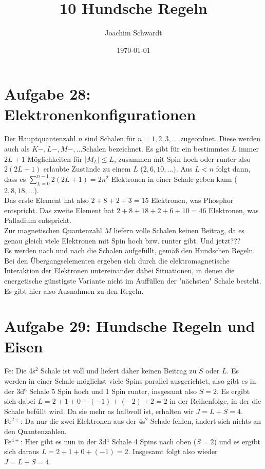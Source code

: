 \documentclass[a4paper,12pt]{article}
\begin{document}
\title{10 Hundsche Regeln}
\author{Joachim Schwardt}
\date{\today}
\maketitle

\section*{Aufgabe 28: Elektronenkonfigurationen}
Der Hauptquantenzahl $n$ sind Schalen für $n=1,2,3,\dots$ zugeordnet. Diese werden auch als $K-,L-,M-,\dots$Schalen bezeichnet. Es gibt für ein bestimmtes $L$ immer $2L+1$ Möglichkeiten für $|M_L|\le L$, zusammen mit Spin hoch oder runter also $2(2L+1)$ erlaubte Zustände zu einem $L$ ($2,6,10,\dots)$. Aus $L<n$ folgt dann, dass es $\sum_{L=0}^{n-1}2(2L+1)=2n^2$ Elektronen in einer Schale geben kann ($2,8,18,\dots$). \\
Das erste Element hat also $2+8+2+3=15$ Elektronen, was Phosphor entspricht. Das zweite Element hat $2+8+18+2+6+10=46$ Elektronen, was Palladium entspricht.\\
Zur magnetischen Quantenzahl $M$ liefern volle Schalen keinen Beitrag, da es genau gleich viele Elektronen mit Spin hoch bzw. runter gibt. Und jetzt???\\
Es werden nach und nach die Schalen aufgefüllt, gemäß den Hundschen Regeln. Bei den Übergangselementen ergeben sich durch die elektromagnetische Interaktion der Elektronen untereinander dabei Situationen, in denen die energetische günstigste Variante nicht im Auffüllen der "nächsten" Schale besteht. Es gibt hier also Ausnahmen zu den Regeln. 
\section*{Aufgabe 29: Hundsche Regeln und Eisen}
Fe: Die 4s${}^2$ Schale ist voll und liefert daher keinen Beitrag zu $S$ oder $L$. Es werden in einer Schale möglichst viele Spins parallel ausgerichtet, also gibt es in der 3d${}^6$ Schale 5 Spin hoch und 1 Spin runter, insgesamt also $S=2$. Es ergibt sich dabei $L=2+1+0+(-1)+(-2)+2=2$ in der Reihenfolge, in der die Schale befüllt wird. Da sie mehr as halbvoll ist, erhalten wir $J=L+S=4$.\\
Fe${}^{2+}$: Da nur die zwei Elektronen aus der 4s${}^2$ Schale fehlen, ändert sich nichts an den Quantenzahlen.\\
Fe${}^{4+}$: Hier gibt es nun in der 3d${}^4$ Schale 4 Spins nach oben ($S=2$) und es ergibt sich daraus $L=2+1+0+(-1)=2$. Insgesamt folgt also wieder $J=L+S=4$.
\end{document}
